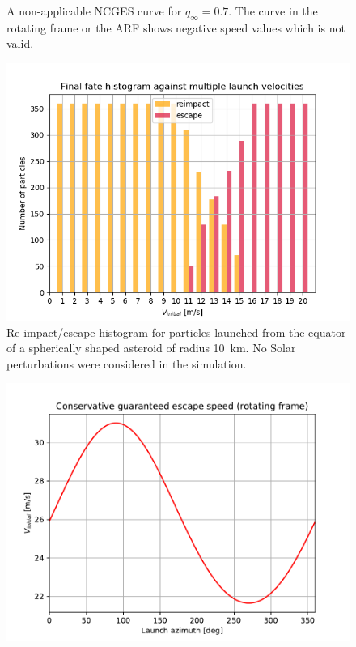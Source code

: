 \documentclass[print]{tudelft-report}
\begin{document}
\begin{appendices}
\begin{figure}[htb]
    \caption{A non-applicable \gls{NCGES} curve for $q_\infty=0.7$. The curve in the rotating frame or the \gls{ARF} shows negative speed values which is not valid.}
    \label{fig:non_conservative_qinfinity_0.7}
    \end{figure}
    \FloatBarrier
    \begin{figure}[htb]
    \centering
    \captionsetup{justification=centering}
    \includegraphics[width=\textwidth, height=0.4\textheight, keepaspectratio=true]{Results/Images/longest_edge_no_perturbations/spherical_asteroid/final_fate_histogram_against_all_velocities.png}
    \caption{Re-impact/escape histogram for particles launched from the equator of a spherically shaped asteroid of radius \SI{10}{\kilo\metre}. No Solar perturbations were considered in the simulation.}
    \label{fig:spherical_asteroid_10km_histogram}
    \end{figure}
    \FloatBarrier
    \begin{figure}[htb]
    \centering
    \captionsetup{justification=centering}
    \includegraphics[width=\textwidth, height=0.4\textheight, keepaspectratio=true]{Results/Images/longest_edge_no_perturbations/spherical_asteroid/conservative_guaranteed_escape_speed_sphere_20km.pdf}

\end{figure}
\end{appendices}
\end{document}
